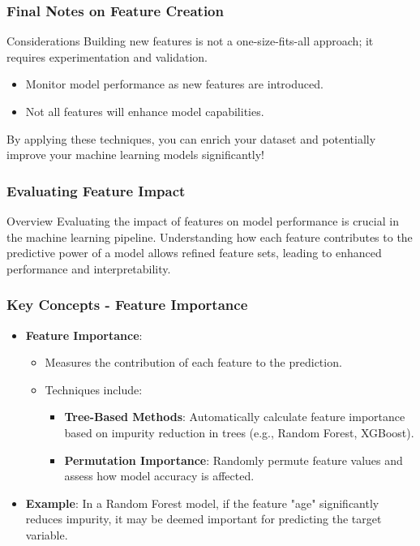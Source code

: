 \documentclass[aspectratio=169]{beamer}
\begin{document}
\begin{frame}[fragile]
    \frametitle{Final Notes on Feature Creation}
    \begin{block}{Considerations}
        Building new features is not a one-size-fits-all approach; it requires experimentation and validation. 
        \begin{itemize}
            \item Monitor model performance as new features are introduced.
            \item Not all features will enhance model capabilities.
        \end{itemize}
    \end{block}
    
    By applying these techniques, you can enrich your dataset and potentially improve your machine learning models significantly!
\end{frame}

\begin{frame}[fragile]
    \frametitle{Evaluating Feature Impact}
    \begin{block}{Overview}
        Evaluating the impact of features on model performance is crucial in the machine learning pipeline. 
        Understanding how each feature contributes to the predictive power of a model allows refined feature sets, leading to enhanced performance and interpretability.
    \end{block}
\end{frame}

\begin{frame}[fragile]
    \frametitle{Key Concepts - Feature Importance}
    \begin{itemize}
        \item \textbf{Feature Importance}:
        \begin{itemize}
            \item Measures the contribution of each feature to the prediction.
            \item Techniques include:
            \begin{itemize}
                \item \textbf{Tree-Based Methods}: Automatically calculate feature importance based on impurity reduction in trees (e.g., Random Forest, XGBoost).
                \item \textbf{Permutation Importance}: Randomly permute feature values and assess how model accuracy is affected.
            \end{itemize}
        \end{itemize}
        \item \textbf{Example}: In a Random Forest model, if the feature "age" significantly reduces impurity, it may be deemed important for predicting the target variable.
    \end{itemize}
\end{frame}
\end{document}
